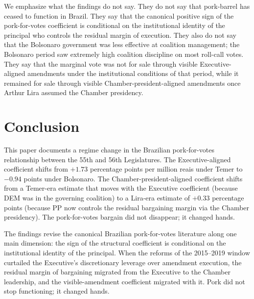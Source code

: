 \documentclass[preprint,12pt,authoryear]{elsarticle}
\begin{document}
We emphasize what the findings do not say. They do not say that pork-barrel has ceased to function in Brazil. They say that the canonical positive sign of the pork-for-votes coefficient is conditional on the institutional identity of the principal who controls the residual margin of execution. They also do not say that the Bolsonaro government was less effective at coalition management; the Bolsonaro period saw extremely high coalition discipline on most roll-call votes. They say that the marginal vote was not for sale through visible Executive-aligned amendments under the institutional conditions of that period, while it remained for sale through visible Chamber-president-aligned amendments once Arthur Lira assumed the Chamber presidency.

\section{Conclusion}
\label{sec:conclusion}

This paper documents a regime change in the Brazilian pork-for-votes relationship between the 55th and 56th Legislatures. The Executive-aligned coefficient shifts from $+1.73$ percentage points per million reais under Temer to $-0.94$ points under Bolsonaro. The Chamber-president-aligned coefficient shifts from a Temer-era estimate that moves with the Executive coefficient (because DEM was in the governing coalition) to a Lira-era estimate of $+0.33$ percentage points (because PP now controls the residual bargaining margin via the Chamber presidency). The pork-for-votes bargain did not disappear; it changed hands.

The findings revise the canonical Brazilian pork-for-votes literature \citep{PereiraAndMueller2004,Raile2011} along one main dimension: the sign of the structural coefficient is conditional on the institutional identity of the principal. When the reforms of the 2015--2019 window curtailed the Executive's discretionary leverage over amendment execution, the residual margin of bargaining migrated from the Executive to the Chamber leadership, and the visible-amendment coefficient migrated with it. Pork did not stop functioning; it changed hands.
\end{document}
